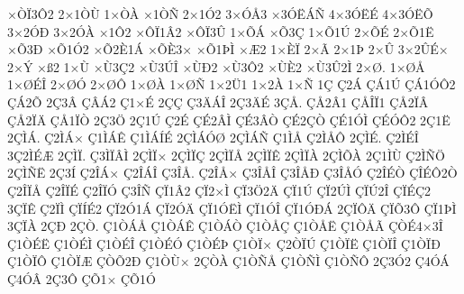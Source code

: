 {^^d7^^d2^^cf3^^d42
2^^d71^^d2^^d9
1^^d7^^d2^^c0
^^d71^^d2^^d1
2^^d71^^d32
3^^d7^^d3^^c53
^^d73^^d3^^cb^^c1^^d1
4^^d73^^d3^^cb^^c9
4^^d73^^d3^^cb^^d5
3^^d72^^d3^^d0
3^^d72^^d3^^c0
^^d71^^d42
^^d7^^d4^^cf1^^c22
^^d7^^d4^^cf3^^db
1^^d7^^d5^^c1
^^d7^^d53^^c7
1^^d7^^d51^^da
2^^d7^^d5^^c9
2^^d7^^d51^^cb
^^d7^^d53^^d0
^^d7^^d51^^d32
^^d7^^d52^^c81^^c1
^^d7^^d5^^c83^^d7
^^d7^^d51^^de^^cc
^^d7^^c62
1^^d7^^c8^^cf
2^^d7^^c3
2^^d71^^de
2^^d7^^db
3^^d72^^db^^c9^^d7
2^^d7^^dd
^^d7^^df2
1^^d7^^d9
^^d7^^d93^^c72
^^d7^^d93^^da^^ce
^^d7^^d9^^d02
^^d7^^d93^^d42
^^d7^^d9^^c82
^^d7^^d93^^db2^^cc
2^^d7^^d8.
1^^d7^^d8^^c5
1^^d7^^d8^^c9^^ce
2^^d7^^d8^^d3
2^^d7^^d8^^d4
1^^d7^^d8^^c0
1^^d7^^d8^^d1
1^^d72^^dc1
1^^d72^^c0
1^^d7^^d1
1^^c7
^^c72^^c1
^^c7^^c11^^da
^^c7^^c11^^d3^^d42
^^c7^^c12^^d5
2^^c73^^c2
^^c7^^c2^^c12
^^c71^^d7^^c9
2^^c7^^c7
^^c73^^c4^^c1^^ce
2^^c73^^c4^^c9
3^^c7^^c5.
^^c7^^c52^^c21
^^c7^^c5^^ce^^cf1
^^c7^^c52^^cf^^c2
^^c7^^c52^^cf^^c4
^^c7^^c51^^cf^^d2
2^^c73^^d6
2^^c71^^da
^^c72^^c9
^^c7^^c92^^c2^^cc
^^c7^^c93^^c2^^d2
^^c7^^c92^^c7^^d2
^^c7^^c91^^d3^^cc
^^c7^^c9^^d3^^d42
2^^c71^^cb
2^^c7^^cc^^c1.
^^c72^^cc^^c1^^d7
^^c71^^cc^^c1^^ca
^^c71^^cc^^c1^^cd^^c9
2^^c7^^cc^^c1^^d3^^d8
2^^c7^^cc^^c1^^d1
^^c71^^cc^^c5
^^c72^^cc^^c5^^d4
2^^c7^^cc^^c9.
^^c72^^cc^^c9^^ce
3^^c72^^cc^^c9^^c6
2^^c7^^cc^^cf.
^^c73^^cc^^cf^^c2^^cc
2^^c7^^cc^^cf^^d7
2^^c7^^cc^^cf^^c7
2^^c7^^cc^^cf^^c5
2^^c7^^cc^^cf^^ca
2^^c7^^cc^^cf^^c0
2^^c7^^cc^^d5^^c0
2^^c71^^cc^^d9
^^c72^^cc^^d1^^d6
2^^c7^^cc^^d1^^cb
2^^c73^^cd
^^c72^^ce^^c1^^d7
^^c72^^ce^^c1^^ce
^^c73^^ce^^c5.
^^c72^^ce^^c5^^d7
^^c73^^ce^^c5^^ce
^^c73^^ce^^c5^^d0
^^c73^^ce^^c5^^d3
^^c72^^ce^^c9^^d2
^^c7^^ce^^c9^^d42^^d2
^^c72^^ce^^cf^^c5
^^c72^^ce^^cf^^c9
^^c72^^ce^^cf^^d3
^^c73^^ce^^d1
^^c7^^cf1^^c22
^^c7^^cf2^^d7^^cc
^^c7^^cf3^^d62^^c4
^^c7^^cf1^^da
^^c7^^cf2^^da^^cc
^^c7^^cf^^da2^^ce
^^c7^^cf^^c9^^c72
3^^c7^^cf^^ca
^^c72^^cf^^cc
^^c7^^cf^^cd^^c92
^^c7^^cf2^^d31^^c1
^^c7^^cf2^^d3^^c4
^^c7^^cf1^^d3^^cb^^cc
^^c7^^cf1^^d3^^ce
^^c7^^cf1^^d3^^d0^^c1
2^^c7^^cf^^d4^^c4
^^c7^^cf^^d53^^d4
^^c7^^cf1^^de^^cc
3^^c7^^cf^^c0
2^^c7^^d0
2^^c7^^d2.
^^c71^^d2^^c1^^c5
^^c71^^d2^^c1^^ca
^^c71^^d2^^c1^^d2
^^c71^^d2^^c5^^c7
^^c71^^d2^^c5^^cb
^^c71^^d2^^c5^^c3
^^c7^^d2^^c94^^d73^^ce
^^c71^^d2^^c9^^cb
^^c71^^d2^^c9^^cc
^^c71^^d2^^c9^^ce
^^c71^^d2^^c9^^d3
^^c71^^d2^^c9^^de
^^c71^^d2^^cf^^d7
^^c72^^d2^^cf^^da
^^c71^^d2^^cf^^cb
^^c71^^d2^^cf^^ce
^^c71^^d2^^cf^^d0
^^c71^^d2^^cf^^d4
^^c71^^d2^^cf^^c6
^^c7^^d2^^d52^^d0
^^c71^^d2^^d9^^d7
2^^c7^^d2^^c0
^^c71^^d2^^d1^^c5
^^c71^^d2^^d1^^cc
^^c71^^d2^^d1^^d4
2^^c73^^d32
^^c74^^d3^^c1
^^c74^^d3^^c2
2^^c73^^d4
^^c7^^d51^^d7
^^c7^^d51^^d3
}
